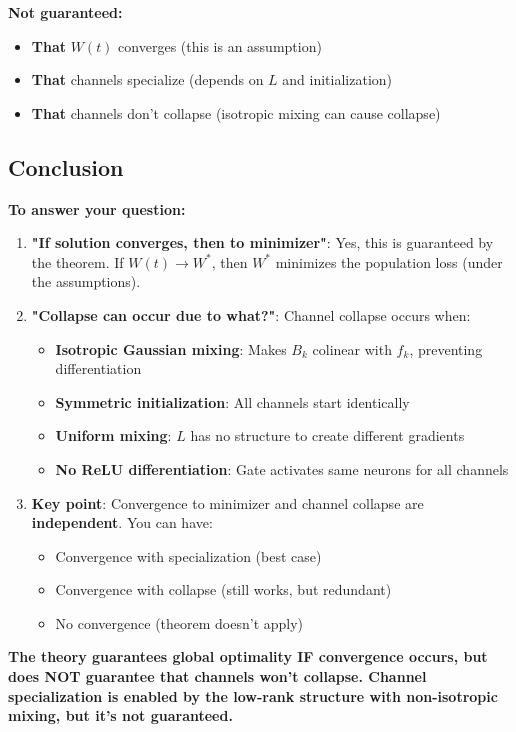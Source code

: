 \textbf{Not guaranteed:}
\begin{itemize}
\item \textbf{That} $W(t)$ converges (this is an assumption)
\item \textbf{That} channels specialize (depends on $L$ and initialization)
\item \textbf{That} channels don't collapse (isotropic mixing can cause collapse)
\end{itemize}

\subsection{Conclusion}

\textbf{To answer your question:}

\begin{enumerate}
\item \textbf{"If solution converges, then to minimizer"}: Yes, this is guaranteed by the theorem. If $W(t) \to W^*$, then $W^*$ minimizes the population loss (under the assumptions).

\item \textbf{"Collapse can occur due to what?"}: Channel collapse occurs when:
   \begin{itemize}
   \item \textbf{Isotropic Gaussian mixing}: Makes $B_k$ colinear with $f_k$, preventing differentiation
   \item \textbf{Symmetric initialization}: All channels start identically
   \item \textbf{Uniform mixing}: $L$ has no structure to create different gradients
   \item \textbf{No ReLU differentiation}: Gate activates same neurons for all channels
   \end{itemize}

\item \textbf{Key point}: Convergence to minimizer and channel collapse are \textbf{independent}. You can have:
   \begin{itemize}
   \item Convergence with specialization (best case)
   \item Convergence with collapse (still works, but redundant)
   \item No convergence (theorem doesn't apply)
   \end{itemize}
\end{enumerate}

\textbf{The theory guarantees global optimality IF convergence occurs, but does NOT guarantee that channels won't collapse. Channel specialization is enabled by the low-rank structure with non-isotropic mixing, but it's not guaranteed.}
